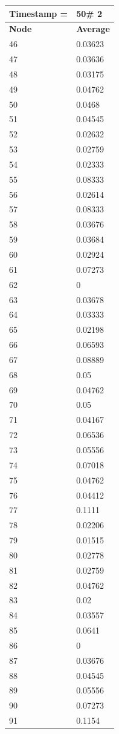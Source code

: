 \begin{tabular}{|l||l|}
\hline
\textbf{Timestamp =} & \textbf{50}\# 2\\\hline
	\textbf{Node} & \textbf{Average} \\ \hline
\hline
	46 & 0.03623 \\ \hline
	47 & 0.03636 \\ \hline
	48 & 0.03175 \\ \hline
	49 & 0.04762 \\ \hline
	50 & 0.0468 \\ \hline
	51 & 0.04545 \\ \hline
	52 & 0.02632 \\ \hline
	53 & 0.02759 \\ \hline
	54 & 0.02333 \\ \hline
	55 & 0.08333 \\ \hline
	56 & 0.02614 \\ \hline
	57 & 0.08333 \\ \hline
	58 & 0.03676 \\ \hline
	59 & 0.03684 \\ \hline
	60 & 0.02924 \\ \hline
	61 & 0.07273 \\ \hline
	62 & 0 \\ \hline
	63 & 0.03678 \\ \hline
	64 & 0.03333 \\ \hline
	65 & 0.02198 \\ \hline
	66 & 0.06593 \\ \hline
	67 & 0.08889 \\ \hline
	68 & 0.05 \\ \hline
	69 & 0.04762 \\ \hline
	70 & 0.05 \\ \hline
	71 & 0.04167 \\ \hline
	72 & 0.06536 \\ \hline
	73 & 0.05556 \\ \hline
	74 & 0.07018 \\ \hline
	75 & 0.04762 \\ \hline
	76 & 0.04412 \\ \hline
	77 & 0.1111 \\ \hline
	78 & 0.02206 \\ \hline
	79 & 0.01515 \\ \hline
	80 & 0.02778 \\ \hline
	81 & 0.02759 \\ \hline
	82 & 0.04762 \\ \hline
	83 & 0.02 \\ \hline
	84 & 0.03557 \\ \hline
	85 & 0.0641 \\ \hline
	86 & 0 \\ \hline
	87 & 0.03676 \\ \hline
	88 & 0.04545 \\ \hline
	89 & 0.05556 \\ \hline
	90 & 0.07273 \\ \hline
	91 & 0.1154 \\ \hline
\end{tabular}
